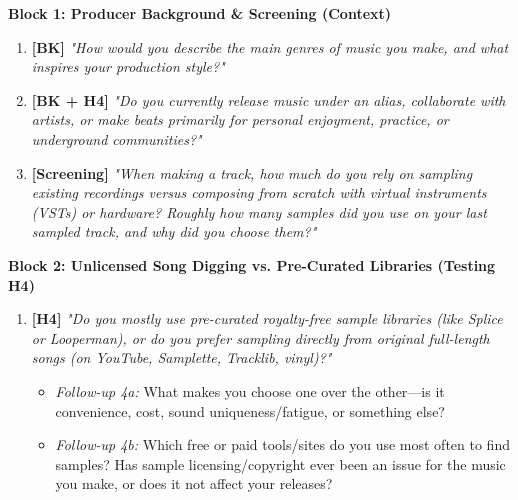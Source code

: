 \vspace{0.3em}
\noindent\textbf{Block 1: Producer Background \& Screening (Context)}
\begin{enumerate}[leftmargin=*, nosep]
    \item \textbf{[BK]} \textit{"How would you describe the main genres of music you make, and what inspires your production style?"}
    \item \textbf{[BK + H4]} \textit{"Do you currently release music under an alias, collaborate with artists, or make beats primarily for personal enjoyment, practice, or underground communities?"}
    \item \textbf{[Screening]} \textit{"When making a track, how much do you rely on sampling existing recordings versus composing from scratch with virtual instruments (VSTs) or hardware? Roughly how many samples did you use on your last sampled track, and why did you choose them?"}
\end{enumerate}

\vspace{0.3em}
\noindent\textbf{Block 2: Unlicensed Song Digging vs. Pre-Curated Libraries (Testing H4)}
\begin{enumerate}[resume, leftmargin=*, nosep]
    \item \textbf{[H4]} \textit{"Do you mostly use pre-curated royalty-free sample libraries (like Splice or Looperman), or do you prefer sampling directly from original full-length songs (on YouTube, Samplette, Tracklib, vinyl)?"}
    \begin{itemize}[leftmargin=1.5cm, nosep]
        \item \textit{Follow-up 4a:} What makes you choose one over the other---is it convenience, cost, sound uniqueness/fatigue, or something else?
        \item \textit{Follow-up 4b:} Which free or paid tools/sites do you use most often to find samples? Has sample licensing/copyright ever been an issue for the music you make, or does it not affect your releases?
    \end{itemize}
\end{enumerate}

